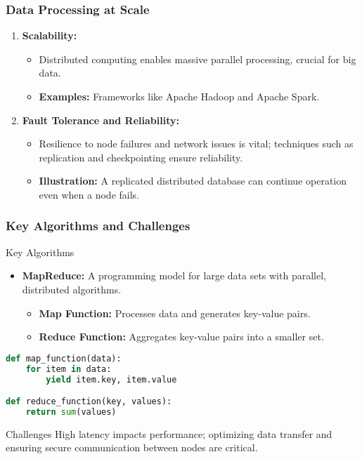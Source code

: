 \documentclass[aspectratio=169]{beamer}
\begin{document}
\begin{frame}[fragile]
  \frametitle{Data Processing at Scale}
  \begin{enumerate}
    \item \textbf{Scalability:} 
      \begin{itemize}
        \item Distributed computing enables massive parallel processing, crucial for big data.
        \item \textbf{Examples:} Frameworks like Apache Hadoop and Apache Spark.
      \end{itemize}
    
    \item \textbf{Fault Tolerance and Reliability:}
      \begin{itemize}
        \item Resilience to node failures and network issues is vital; techniques such as replication and checkpointing ensure reliability.
        \item \textbf{Illustration:} A replicated distributed database can continue operation even when a node fails.
      \end{itemize}
  \end{enumerate}
\end{frame}

\begin{frame}[fragile]
  \frametitle{Key Algorithms and Challenges}
  \begin{block}{Key Algorithms}
    \begin{itemize}
      \item \textbf{MapReduce:} A programming model for large data sets with parallel, distributed algorithms.
      \begin{itemize}
        \item \textbf{Map Function:} Processes data and generates key-value pairs.
        \item \textbf{Reduce Function:} Aggregates key-value pairs into a smaller set.
      \end{itemize}
    \end{itemize}
    
    \begin{lstlisting}[language=Python]
def map_function(data):
    for item in data:
        yield item.key, item.value

def reduce_function(key, values):
    return sum(values)
    \end{lstlisting}
  \end{block}
  
  \begin{block}{Challenges}
    High latency impacts performance; optimizing data transfer and ensuring secure communication between nodes are critical.
  \end{block}
\end{frame}
\end{document}
